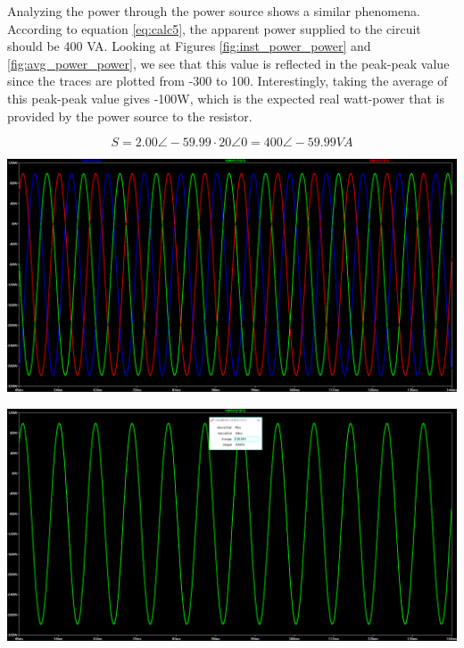 \documentclass[journal]{IEEEtran}
\begin{document}
\noindent Analyzing the power through the power source shows a similar phenomena. According to equation \ref{eq:calc5}, the apparent power supplied to the circuit should be 400 VA. Looking at Figures \ref{fig:inst_power_power} and \ref{fig:avg_power_power}, we see that this value is reflected in the peak-peak value since the traces are plotted from -300 to 100. Interestingly, taking the average of this peak-peak value gives -100W, which is the expected real watt-power that is provided by the power source to the resistor.

\begin{equation} 
S = {2.00 \angle -59.99} \cdot 20 \angle 0 = 400 \angle -59.99 VA
\label{eq:calc5}
\end{equation}

\begingroup
    \centering
    \medskip
    \includegraphics[width=\columnwidth]{images/Lab_9_ss_14.PNG}
    \label{fig:inst_power_power}
    \medskip
\endgroup


\begingroup
    \centering
    \medskip
    \includegraphics[width=\columnwidth]{images/Lab_9_ss_15.PNG}
    \label{fig:avg_power_power}
    \medskip
\endgroup
\end{document}
